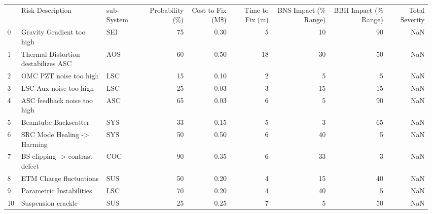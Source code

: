 \begin{tabular}{lllrrrrrr}
\toprule
{} &                     Risk Description & sub-System &  Probability (\%) &  Cost to Fix (M\$) &  Time to Fix (m) &  BNS Impact (\% Range) &  BBH Impact (\% Range) &  Total Severity \\
0  &            Gravity Gradient too high &        SEI &               75 &              0.30 &                5 &                    10 &                    90 &             NaN \\
1  &  Thermal Distortion destabilizes ASC &        AOS &               60 &              0.50 &               18 &                    30 &                    50 &             NaN \\
2  &               OMC PZT noise too high &        LSC &               15 &              0.10 &                2 &                     5 &                     5 &             NaN \\
3  &               LSC Aux noise too high &        LSC &               25 &              0.03 &                3 &                    15 &                    15 &             NaN \\
4  &          ASC feedback noise too high &        ASC &               65 &              0.03 &                6 &                     5 &                    90 &             NaN \\
5  &                 Beamtube Backscatter &        SYS &               33 &              0.15 &                5 &                     3 &                    65 &             NaN \\
6  &          SRC Mode Healing -> Harming &        SYS &               50 &              0.50 &                6 &                    40 &                     5 &             NaN \\
7  &       BS clipping -> contrast defect &        COC &               90 &              0.35 &                6 &                    33 &                     3 &             NaN \\
8  &              ETM Charge fluctuations &        SUS &               50 &              0.20 &                4 &                    15 &                    40 &             NaN \\
9  &             Parametric Instabilities &        LSC &               70 &              0.20 &                4 &                    40 &                     5 &             NaN \\
10 &                   Suspension crackle &        SUS &               25 &              0.25 &                7 &                     5 &                    50 &             NaN \\

\end{tabular}
